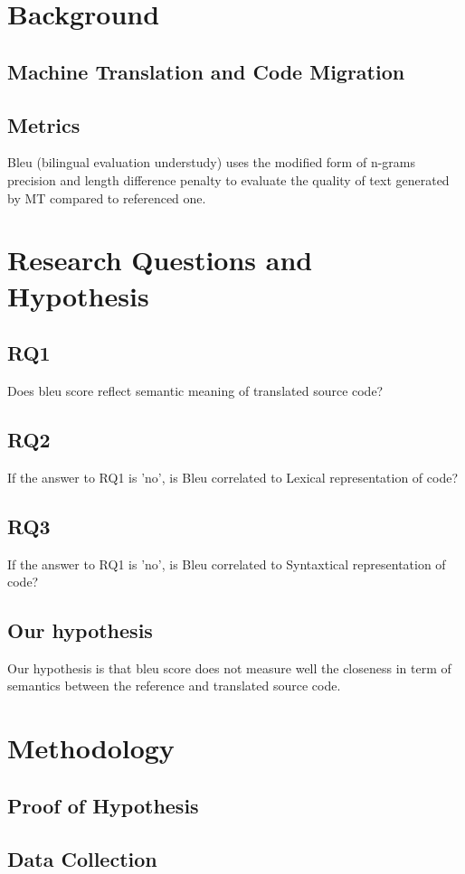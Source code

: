 \section{Background}
\subsection{Machine Translation and Code Migration}
\subsection{Metrics}
Bleu (bilingual evaluation understudy) uses the modified form of n-grams precision and length difference penalty to evaluate the quality of text generated by MT compared to referenced one.

\section{Research Questions and Hypothesis}
\subsection{RQ1}
Does bleu score reflect semantic meaning of translated source code?
\subsection{RQ2} 
If the answer to RQ1 is 'no', is Bleu correlated to Lexical representation of code?
\subsection{RQ3} 
If the answer to RQ1 is 'no', is Bleu correlated to Syntaxtical representation of code?
\subsection{Our hypothesis}
Our hypothesis is that bleu score does not measure well the closeness in term of semantics between the reference and translated source code. 
\section{Methodology}
\subsection{Proof of Hypothesis}
\subsection{Data Collection}

